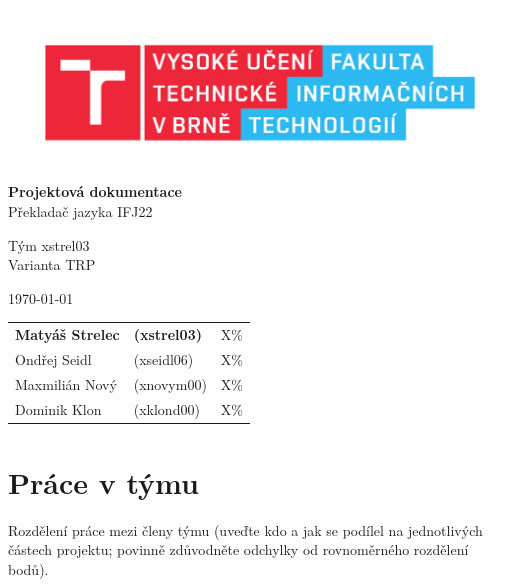 \documentclass[11pt,a4paper]{article}
\begin{document}
    \begin{titlepage}
        \begin{center}
            \includegraphics[scale=0.65]{include/fit.pdf} \\

            \LARGE{
                \textbf{
                    Projektová dokumentace} \\
                Překladač jazyka IFJ22} \\
                
            \vspace{2cm}
            
            \Large{
                Tým xstrel03 \\
                Varianta TRP \\
            }
                
            \vspace{2cm}
            
            \normalsize{}
            \today{}

            \vspace{2cm}

            \begin{tabular}{l l l}
                \textbf{Matyáš Strelec} & \textbf{(xstrel03)}   & \quad X\% \\
                Ondřej Seidl            & (xseidl06)            & \quad X\% \\
                Maxmilián Nový          & (xnovym00)            & \quad X\% \\
                Dominik Klon            & (xklond00)            & \quad X\% \\
            \end{tabular}
        \end{center}
    \end{titlepage}

    \tableofcontents

    \pagebreak{}

    \section{Práce v týmu}
    Rozdělení práce mezi členy týmu (uveďte kdo a jak se podílel na jednotlivých
    částech projektu; povinně zdůvodněte odchylky od rovnoměrného rozdělení bodů).
    
\end{document}
